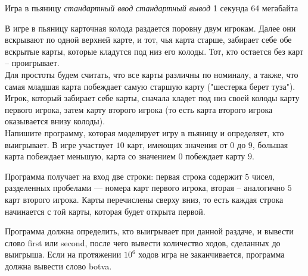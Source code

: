 \begin{problem}%
{Игра в пьяницу}%
{\textsl{стандартный ввод}}%
{\textsl{стандартный вывод}}%
{1 секунда}%
{64 мегабайта}%
{}

В игре в пьяницу карточная колода раздается поровну двум игрокам. Далее они вскрывают по одной верхней карте, и тот, чья карта старше, забирает себе обе вскрытые карты, которые кладутся под низ его колоды. Тот, кто остается без карт – проигрывает.\\

Для простоты будем считать, что все карты различны по номиналу, а также, что самая младшая карта побеждает самую старшую карту ("шестерка берет туза").\\

Игрок, который забирает себе карты, сначала кладет под низ своей колоды карту первого игрока, затем карту второго игрока (то есть карта второго игрока оказывается внизу колоды).\\

Напишите программу, которая моделирует игру в пьяницу и определяет, кто выигрывает. В игре участвует $10$ карт, имеющих значения от $0$ до $9$, большая карта побеждает меньшую, карта со значением $0$ побеждает карту $9$.

\InputFile

Программа получает на вход две строки: первая строка содержит $5$ чисел, разделенных пробелами — номера карт первого игрока, вторая – аналогично $5$ карт второго игрока. Карты перечислены сверху вниз, то есть каждая строка начинается с той карты, которая будет открыта первой.

\OutputFile

Программа должна определить, кто выигрывает при данной раздаче, и вывести слово first или second, после чего вывести количество ходов, сделанных до выигрыша. Если на протяжении $10^6$ ходов игра не заканчивается, программа должна вывести слово botva.

\Examples

\begin{example}
%
\end{example}
\end{problem}